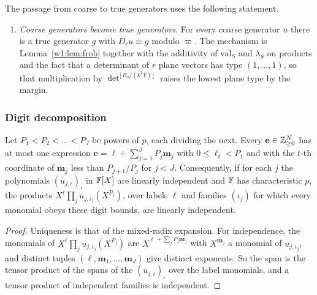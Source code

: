 The passage from coarse to true generators uses the following statement.

\begin{enumerate}[label=(A\arabic*),start=2,leftmargin=*]
\item \emph{Coarse generators become true generators}. For every coarse generator $u$ there is a true generator $g$ with $D_\ell u\equiv g$ modulo $\varpi$. The mechanism is Lemma~\ref{w1:lem:frob} together with the additivity of $\mathrm{val}_S$ and $\lambda_S$ on products and the fact that a determinant of $r$ plane vectors has type $(1,\dots,1)$, so that multiplication by $\det^{\lfloor B_o/(k^2Y)\rfloor}$ raises the lowest plane type by the margin.
\end{enumerate}


\subsubsection{Digit decomposition}

\begin{lemma}\label{w1:lem:digits}
Let $P_1<P_2<\dots<P_J$ be powers of $p$, each dividing the next. Every $\mathbf e\in\mathbb Z_{\ge0}^N$ has at most one expression $\mathbf e=\boldsymbol\ell+\sum_{j=1}^JP_j\mathbf m_j$ with $0\le\ell_t<P_1$ and with the $t$-th coordinate of $\mathbf m_j$ less than $P_{j+1}/P_j$ for $j<J$. Consequently, if for each $j$ the polynomials $(u_{j,\iota})_\iota$ in $\mathbb F[X]$ are linearly independent and $\mathbb F$ has characteristic $p$, the products $X^{\boldsymbol\ell}\prod_ju_{j,\iota_j}(X^{P_j})$, over labels $\boldsymbol\ell$ and families $(\iota_j)$ for which every monomial obeys these digit bounds, are linearly independent.
\end{lemma}

\begin{proof}
Uniqueness is that of the mixed-radix expansion. For independence, the monomials of $X^{\boldsymbol\ell}\prod_ju_{j,\iota_j}(X^{P_j})$ are $X^{\boldsymbol\ell+\sum_jP_j\mathbf m_j}$ with $X^{\mathbf m_j}$ a monomial of $u_{j,\iota_j}$, and distinct tuples $(\boldsymbol\ell,\mathbf m_1,\dots,\mathbf m_J)$ give distinct exponents. So the span is the tensor product of the spans of the $(u_{j,\iota})_\iota$ over the label monomials, and a tensor product of independent families is independent.
\end{proof}



